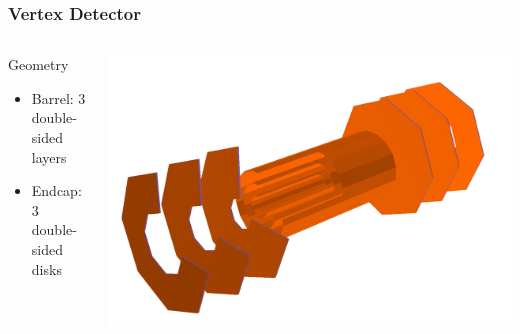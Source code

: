 \documentclass[hyperref={colorlinks=true,pdfpagelabels=false,linkcolor=black}, xcolor=dvipsnames,10pt]{beamer}
\begin{document}
\begin{frame}
	\frametitle{Vertex Detector}
	
	\begin{columns}
	
	\begin{block}{Geometry}
	\begin{itemize}
	\item Barrel: 3 double-sided layers
	\item Endcap: 3 double-sided disks
	\end{itemize}
	\end{block}

	
	\centering
	\includegraphics[width=\textwidth]{../figures/Vertex.png}
	\end{columns}
\end{frame}
\end{document}
